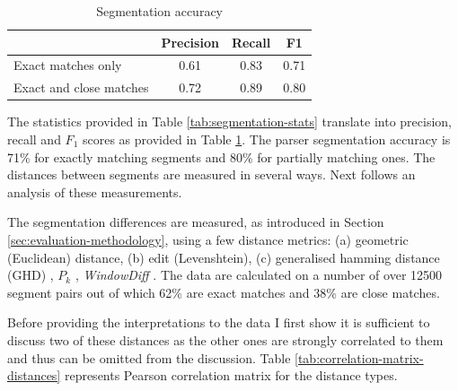     
    \begin{table}[!ht]
    \centering
    \begin{tabular}{lccc}
    \toprule
    {} &  Precision &  Recall &   F1 \\
    \midrule
    Exact matches only &        0.61 &    0.83 & 0.71 \\
    Exact and close matches                &        0.72 &    0.89 & 0.80 \\
    \bottomrule
    \end{tabular}
    \caption{Segmentation accuracy}
    \label{tab:segmentation-accuracy}
    \end{table}
    
    The statistics provided in Table \ref{tab:segmentation-stats} translate into precision, recall and $F_1$ scores as provided in Table \ref{tab:segmentation-accuracy}. The parser segmentation accuracy is 71\% for exactly matching segments and 80\% for partially matching ones. The distances between segments are measured in several ways. Next follows an analysis of these measurements. 
    
    The segmentation differences are measured, as introduced in Section \ref{sec:evaluation-methodology}, using a few distance metrics: (a) geometric (Euclidean) distance, (b) edit (Levenshtein), (c) generalised hamming distance (GHD) \citep{Bookstein2002}, $P_k$ \citep[198--200]{beeferman1999statistical}, \textit{WindowDiff} \citep[10]{pevzner2002critique}. 
    The data are calculated on a number of over 12500 segment pairs out of which 62\% are exact matches and 38\% are close matches. 
    
    Before providing the interpretations to the data I first show it is sufficient to discuss two of these distances as the other ones are strongly correlated to them and thus can be omitted from the discussion. Table \ref{tab:correlation-matrix-distances} represents Pearson correlation matrix for the distance types. 
    
    \begin{table}[!ht]
    \centering
    \caption{Pearson correlation coefficients for pairs of distance measure types}
    \label{tab:correlation-matrix-distances}
    \end{table}
    

